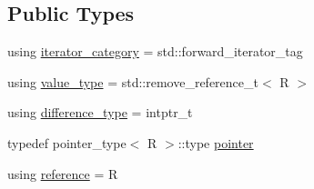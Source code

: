 \subsection*{Public Types}
\begin{DoxyCompactItemize}
\item 
using \mbox{\hyperlink{struct_r_a_h___n_a_m_e_s_p_a_c_e_1_1iterator__facade_3_01_i_00_01_r_00_01std_1_1forward__iterator__tag_01_4_a975db251eb3e0733ff4292fa11cc8f89}{iterator\+\_\+category}} = std\+::forward\+\_\+iterator\+\_\+tag
\item 
using \mbox{\hyperlink{struct_r_a_h___n_a_m_e_s_p_a_c_e_1_1iterator__facade_3_01_i_00_01_r_00_01std_1_1forward__iterator__tag_01_4_a162163100d237148e405c580ac7bc4d2}{value\+\_\+type}} = std\+::remove\+\_\+reference\+\_\+t$<$ R $>$
\item 
using \mbox{\hyperlink{struct_r_a_h___n_a_m_e_s_p_a_c_e_1_1iterator__facade_3_01_i_00_01_r_00_01std_1_1forward__iterator__tag_01_4_adf499134563d0c20cda17794f2239e1c}{difference\+\_\+type}} = intptr\+\_\+t
\item 
typedef pointer\+\_\+type$<$ R $>$\+::type \mbox{\hyperlink{struct_r_a_h___n_a_m_e_s_p_a_c_e_1_1iterator__facade_3_01_i_00_01_r_00_01std_1_1forward__iterator__tag_01_4_abbdec49f04697e252564ed4a748b1f7e}{pointer}}
\item 
using \mbox{\hyperlink{struct_r_a_h___n_a_m_e_s_p_a_c_e_1_1iterator__facade_3_01_i_00_01_r_00_01std_1_1forward__iterator__tag_01_4_ae9aa37697c41367b43358a658d574185}{reference}} = R
\end{DoxyCompactItemize}
